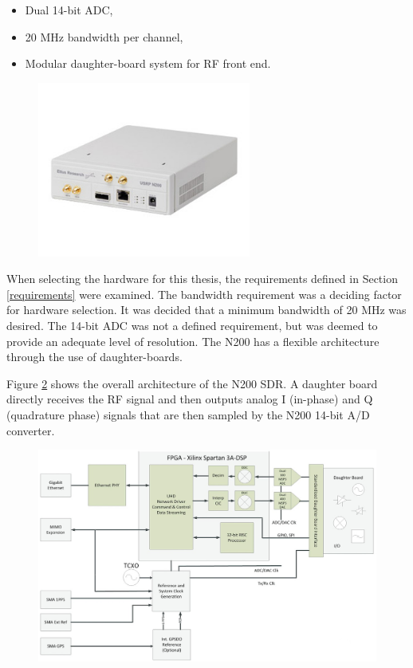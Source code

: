 \begin{itemize}
\item Dual 14-bit ADC,
\item 20 MHz bandwidth per channel,
\item Modular daughter-board system for RF front end.
\end{itemize}

{\begin{figure}[h!tb] 
\centering
\includegraphics[width=7cm]{Images/n200}
\label{N200}
\end{figure}
}

When selecting the hardware for this thesis, the requirements defined in Section \ref{requirements} were examined.  The bandwidth requirement was a deciding factor for hardware selection.  It was decided that a minimum bandwidth of 20 MHz was desired.  The 14-bit ADC was not a defined requirement, but was deemed to provide an adequate level of resolution.  The N200 has a flexible architecture through the use of daughter-boards.  

Figure \ref{N200_block} shows the overall architecture of the N200 SDR.  A daughter board directly receives the RF signal and then outputs analog I (in-phase) and Q (quadrature phase) signals that are then sampled by the N200 14-bit  A/D converter.

{\begin{figure}[h!tb] 
\centering
\includegraphics[width=14cm]{Images/n200_block_edited}
\label{N200_block}
\end{figure}
}

